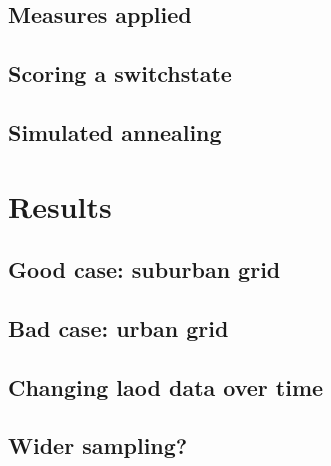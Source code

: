 \documentclass[a4paper]{report}
\begin{document}




\section{Measures applied}




\section{Scoring a switchstate}


\section{Simulated annealing}

\chapter{Results}


\section{Good case: suburban grid}

\section{Bad case: urban grid}

\section{Changing laod data over time}

\section{Wider sampling?}

\printbibliography
\end{document}
